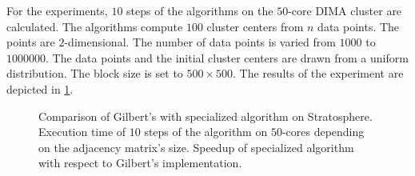 For the experiments, $10$ steps of the \kmeans algorithms on the $50$-core DIMA cluster are calculated.
The algorithms compute $100$ cluster centers from $n$ data points.
The points are $2$-dimensional.
The number of data points is varied from $1000$ to $1000000$.
The data points and the initial cluster centers are drawn from a uniform distribution.
The block size is set to $500\times 500$.
The results of the experiment are depicted in \cref{fig:kmeansResult}.

\begin{figure}
	\centering
	\begin{subfigure}[h]{\dualpgfwidth}
		\caption{}
		\label{fig:kmeansResult}
	\end{subfigure}
	\begin{subfigure}[h]{\dualpgfwidth}
		\caption{}
		\label{fig:kmeansSpeedup}
	\end{subfigure}
	\caption{Comparison of Gilbert's \kmeans with specialized algorithm on Stratosphere.  Execution time of $10$ steps of the \kmeans algorithm on $50$-cores depending on the adjacency matrix's size.  Speedup of specialized algorithm with respect to Gilbert's implementation.}
	\label{fig:kmeansBenchmark}
\end{figure}

